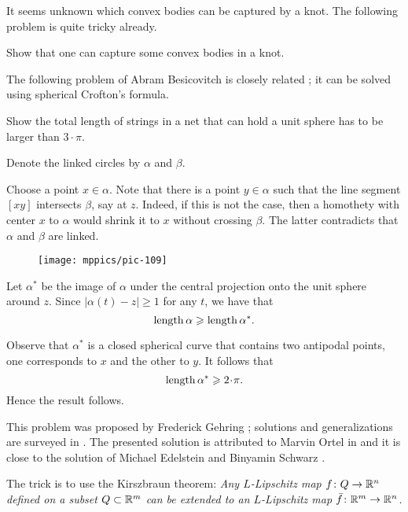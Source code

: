 It seems unknown which convex bodies can be captured by a knot.
The following problem is quite tricky already.

\begin{pr}
Show that one can capture some convex bodies in a knot.
\end{pr}

The following problem of Abram Besicovitch is closely related \cite{besicovitch-sphere}; it can be solved using spherical Crofton's formula.

\begin{pr}
Show the total length of strings in a net that can hold a unit sphere has to be larger than $3\cdot\pi$.
\end{pr}







Denote the linked circles by $\alpha$ and $\beta$. 

Choose a point $x\in\alpha$. 
Note that there is a point $y\in\alpha$ such that the line segment 
$[xy]$ intersects $\beta$, say at $z$. 
Indeed, if this is not the case, 
then a homothety with center $x$ to $\alpha$ would shrink it to $x$ without crossing $\beta$.
The latter contradicts that $\alpha$ and $\beta$ are linked. 

\begin{wrapfigure}{r}{26 mm}
\vskip-2mm
\centering
\texttt{[image: mppics/pic-109]}
\end{wrapfigure}

Let $\alpha^{*}$ be the image of $\alpha$ under the central projection onto the unit sphere around $z$.
Since $|\alpha(t)-z|\ge1$ for any $t$, we have that
$$\operatorname{\rm length} \alpha\geqslant \operatorname{\rm length}\alpha^{*}.$$

Observe that $\alpha^{*}$ is a closed spherical curve that contains two antipodal points,
one corresponds to $x$ and the other to $y$.
It follows that
$$\length \alpha^{*}\ge 2\cdot\pi.$$
Hence the result follows.\qeds



This problem was proposed by Frederick Gehring \cite[see 7.22 in][]{gehring};
solutions and generalizations are surveyed in \cite{mateljevic}. 
The presented solution is attributed to Marvin Ortel in \cite{CJKSW} and it is close to the solution of Michael Edelstein and Binyamin Schwarz \cite{edelstein-schwatz}.

 The trick is to use the Kirszbraun theorem:
\emph{Any $L$-Lipschitz  map $f\colon Q\to \mathbb{R}^n$ defined on a subset $Q\subset \mathbb{R}^m$ can be extended to an $L$-Lipschitz  map $\bar f\colon\mathbb{R}^m\to \mathbb{R}^n$.}

